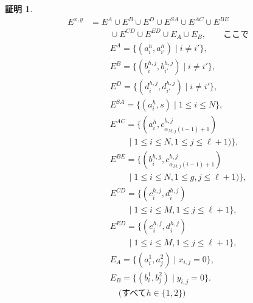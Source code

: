 \documentclass[11pt,a4paper]{jarticle}
\theoremstyle{definition}
\newtheorem*{prf*}{証明}
\begin{document}
\begin{prf*}
\begin{align*}
E^{x,y} &= E^{A} \cup E^{B} \cup E^{D} \cup E^{SA} \cup E^{AC} \cup E^{BE} \\
&\phantom{=} \quad \cup E^{CD} \cup E^{ED} \cup E_{A} \cup E_{B}, \quad \quad \text{ここで}\\
&\phantom{=} \quad E^{A} = \{(a^{h}_{i}, a^{h}_{i'})  \mid i \neq i'\}, \\
&\phantom{=} \quad E^{B} = \{(b^{h,j}_{i}, b^{h,j}_{i'})  \mid i \neq i'\}, \\
&\phantom{=} \quad E^{D} = \{(d^{h,j}_{i}, d^{h,j}_{i'})  \mid i \neq i'\}, \\
&\phantom{=} \quad E^{SA} = \{(a^{h}_{i}, s) \mid 1\leq i \leq N\}, \\
&\phantom{=} \quad E^{AC} = \{(a^{h}_{i},c^{h,j}_{\alpha_{M,j}(i-1)+1}) \\
&\phantom{=} \quad \quad \quad \mid 1\leq i \leq N,1\leq j \leq \ell+1)\}, \\
&\phantom{=} \quad E^{BE} = \{(b^{h,g}_{i},c^{h,j}_{\alpha_{M,j}(i-1)+1}) \\
&\phantom{=} \quad \quad \quad  \mid 1\leq i \leq N,1\leq g,j \leq \ell+1)\}, \\
&\phantom{=} \quad E^{CD} = \{(c^{h, j}_{i}, d^{h, j}_{i}) \\
&\phantom{=} \quad \quad \quad \mid 1\leq i \leq M,1\leq j \leq \ell+1\}, \\
&\phantom{=} \quad E^{ED} = \{(e^{h, j}_{i}, d^{h, j}_{i}) \\
&\phantom{=} \quad \quad \quad \mid 1\leq i \leq M,1\leq j \leq \ell+1\}, \\
&\phantom{=} \quad E_{A} = \{(a^{1}_{i},a^{2}_{j}) \mid x_{i,j}=0\}, \\
&\phantom{=} \quad E_{B} = \{(b^{1}_{i},b^{2}_{j}) \mid y_{i,j}=0\}. \\
&\phantom{=} \quad \quad \text{(すべて$h \in \{1, 2\}$)}
\end{align*}


\end{prf*}
\end{document}
